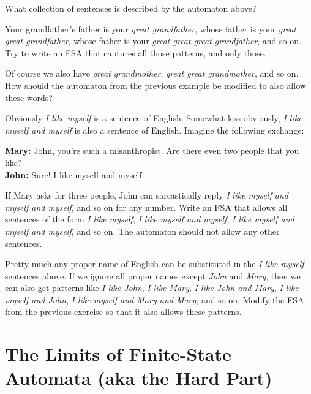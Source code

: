 \medskip
\begin{homework}
    What collection of sentences is described by the automaton above?
\end{homework}

\begin{homework}
    Your grandfather's father is your \emph{great grandfather}, whose father is your \emph{great great grandfather}, whose father is your \emph{great great great grandfather}, and so on.
    Try to write an FSA that captures all those patterns, and only those.
\end{homework}
%
\begin{homework}
    Of course we also have \emph{great grandmother}, \emph{great great grandmother}, and so on.
    How should the automaton from the previous example be modified to also allow these words?
\end{homework}
%
\begin{homework}
    Obviously \emph{I like myself} is a sentence of English.
    Somewhat less obviously, \emph{I like myself and myself} is also a sentence of English.
    Imagine the following exchange:

    \smallskip
    \noindent
    \textbf{Mary:} John, you're such a misanthropist.
    Are there even two people that you like?\\
    \smallskip
    \textbf{John:} Sure! I like myself and myself.
    
    \smallskip
    \noindent
    If Mary asks for three people, John can sarcastically reply \emph{I like myself and myself and myself}, and so on for any number.
    Write an FSA that allows all sentences of the form \emph{I like myself}, \emph{I like myself and myself}, \emph{I like myself and myself and myself}, and so on.
    The automaton should not allow any other sentences.
\end{homework}
%
\begin{homework}
    Pretty much any proper name of English can be substituted in the \emph{I like myself} sentences above.
    If we ignore all proper names except \emph{John} and \emph{Mary}, then we can also get patterns like \emph{I like John}, \emph{I like Mary}, \emph{I like John and Mary}, \emph{I like myself and John}, \emph{I like myself and Mary and Mary}, and so on.
    Modify the FSA from the previous exercise so that it also allows these patterns.
\end{homework}


\section{The Limits of Finite-State Automata (aka the Hard Part)}

